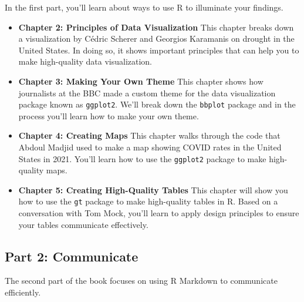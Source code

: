 \documentclass[
]{book}
\providecommand{\tightlist}{%
  \setlength{\itemsep}{0pt}\setlength{\parskip}{0pt}}
\begin{document}
In the first part, you'll learn about ways to use R to illuminate your findings.

\begin{itemize}
\tightlist
\item
  \textbf{Chapter 2: Principles of Data Visualization} This chapter breaks down a visualization by Cédric Scherer and Georgios Karamanis on drought in the United States. In doing so, it shows important principles that can help you to make high-quality data visualization.
\item
  \textbf{Chapter 3: Making Your Own Theme} This chapter shows how journalists at the BBC made a custom theme for the data visualization package known as \texttt{ggplot2}. We'll break down the \texttt{bbplot} package and in the process you'll learn how to make your own theme.
\item
  \textbf{Chapter 4: Creating Maps} This chapter walks through the code that Abdoul Madjid used to make a map showing COVID rates in the United States in 2021. You'll learn how to use the \texttt{ggplot2} package to make high-quality maps.
\item
  \textbf{Chapter 5: Creating High-Quality Tables} This chapter will show you how to use the \texttt{gt} package to make high-quality tables in R. Based on a conversation with Tom Mock, you'll learn to apply design principles to ensure your tables communicate effectively.
\end{itemize}

\hypertarget{part-2-communicate}{%
\subsection*{Part 2: Communicate}\label{part-2-communicate}}

The second part of the book focuses on using R Markdown to communicate efficiently.
\end{document}
